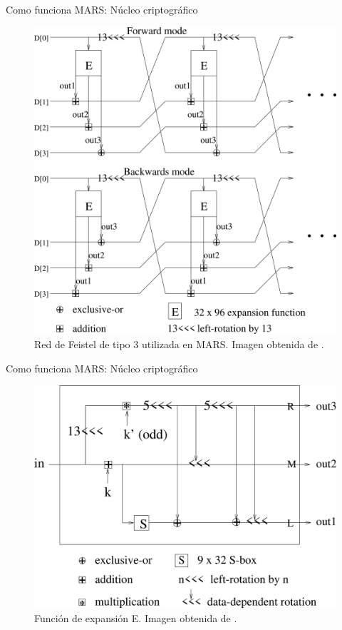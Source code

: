 \documentclass{beamer}
\begin{document}
\begin{frame}{Como funciona MARS: Núcleo criptográfico}
	\begin{figure}[H]
		\centering
		\includegraphics[scale = 0.5]{nucleo_criptografico.png}
		\caption{Red de Feistel de tipo 3 utilizada en MARS. Imagen obtenida de \cite{ampliacionPropuestaMARS}.} \label{fig:nucleo_criptografico}
	\end{figure}
\end{frame}

\begin{frame}{Como funciona MARS: Núcleo criptográfico}
	\begin{figure}[H]
		\centering
		\includegraphics[scale = 0.7]{funcion_e.png}
		\caption{Función de expansión E. Imagen obtenida de \cite{ampliacionPropuestaMARS}.} \label{fig:nucleo_criptografico}
	\end{figure}
\end{frame}
\end{document}
